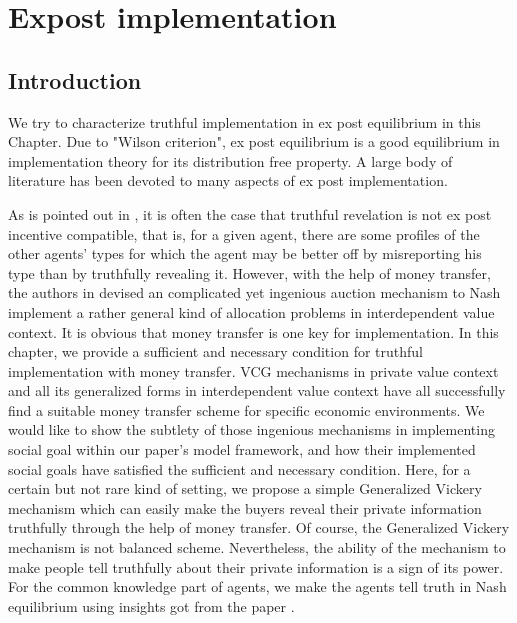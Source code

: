 
\chapter{Expost implementation}  %

\label{Chapter3} %




\section{ Introduction}
 We try to characterize truthful implementation in ex post equilibrium in this Chapter.  Due to "Wilson criterion", ex post equilibrium 
 is a good equilibrium in implementation theory for its distribution free property. A large body of literature has been devoted to 
 many aspects of ex post implementation. 

 

 As is pointed out in \parencite{Postlewaite2014}, it is often the case that truthful revelation is not ex post incentive compatible, that is, for a given 
 agent, there are some profiles of the other agents' types for which the agent may be better off by misreporting his type than by 
 truthfully revealing it. However, with the help of money transfer, the authors in \parencite{Maskin00} devised an complicated yet ingenious 
 auction mechanism to Nash implement a rather general kind of allocation problems in interdependent value context. It is obvious 
 that money transfer is one key for implementation. 
 In this chapter, we provide a sufficient and necessary condition for truthful implementation with money transfer. VCG mechanisms in 
 private value context and all its generalized forms in interdependent value context have all successfully find a suitable
 money transfer scheme for specific economic environments. We would like to show the subtlety of those ingenious mechanisms in 
 implementing social goal within our paper's model framework, and how their implemented social goals have satisfied the sufficient and 
 necessary condition.
 Here, for a certain but not rare kind of setting, we propose a simple Generalized Vickery mechanism which can easily make the buyers
 reveal their private information truthfully through the help of money transfer. Of course, the Generalized Vickery mechanism is not 
 balanced scheme. Nevertheless, the ability of the mechanism to make people tell truthfully about their private information is a sign of 
 its power.   
 For the common knowledge part of agents, we make the agents tell truth in Nash equilibrium using insights got from the paper
 \parencite{Repullo90}.
 
